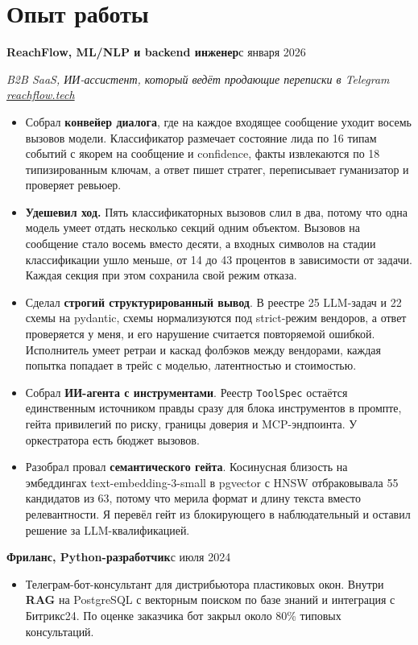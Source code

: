 \documentclass[10pt,a4paper]{article}
\newcommand{\role}[2]{\textbf{#1}\hfill #2\par}
\begin{document}
\section{Опыт работы}

\role{ReachFlow, ML/NLP и backend инженер}{с января 2026}
\textit{B2B SaaS, ИИ-ассистент, который ведёт продающие переписки в Telegram \textperiodcentered{} \href{https://reachflow.tech}{reachflow.tech}}
\begin{itemize}
  \item Собрал \textbf{конвейер диалога}, где на каждое входящее сообщение уходит восемь вызовов модели.
        Классификатор размечает состояние лида по 16 типам событий с якорем на сообщение и confidence, факты
        извлекаются по 18 типизированным ключам, а ответ пишет стратег, переписывает гуманизатор и проверяет ревьюер.
  \item \textbf{Удешевил ход.} Пять классификаторных вызовов слил в два, потому что одна модель умеет отдать
        несколько секций одним объектом. Вызовов на сообщение стало восемь вместо десяти, а входных символов
        на стадии классификации ушло меньше, от 14 до 43 процентов в зависимости от задачи. Каждая секция
        при этом сохранила свой режим отказа.
  \item Сделал \textbf{строгий структурированный вывод}. В реестре 25 LLM-задач и 22 схемы на pydantic, схемы
        нормализуются под strict-режим вендоров, а ответ проверяется у меня, и его нарушение считается повторяемой ошибкой.
        Исполнитель умеет ретраи и каскад фолбэков между вендорами, каждая попытка попадает в трейс с моделью,
        латентностью и стоимостью.
  \item Собрал \textbf{ИИ-агента с инструментами}. Реестр \texttt{ToolSpec} остаётся единственным источником правды
        сразу для блока инструментов в промпте, гейта привилегий по риску, границы доверия и MCP-эндпоинта.
        У оркестратора есть бюджет вызовов.
  \item Разобрал провал \textbf{семантического гейта}. Косинусная близость на эмбеддингах text-embedding-3-small
        в pgvector с HNSW отбраковывала 55 кандидатов из 63, потому что мерила формат и длину текста вместо
        релевантности. Я перевёл гейт из блокирующего в наблюдательный и оставил решение за LLM-квалификацией.
\end{itemize}
\vspace{2pt}

\role{Фриланс, Python-разработчик}{с июля 2024}
\begin{itemize}
  \item Телеграм-бот-консультант для дистрибьютора пластиковых окон. Внутри \textbf{RAG} на PostgreSQL с векторным
        поиском по базе знаний и интеграция с Битрикс24. По оценке заказчика бот закрыл около 80\% типовых консультаций.
\end{itemize}
\vspace{2pt}
\end{document}

